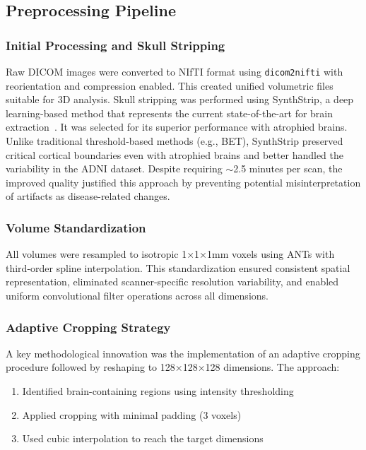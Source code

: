 \documentclass[11pt, a4paper]{article}
\begin{document}
\subsection{Preprocessing Pipeline}

\subsubsection{Initial Processing and Skull Stripping}

Raw DICOM images were converted to NIfTI format using \texttt{dicom2nifti} with reorientation and compression enabled. This created unified volumetric files suitable for 3D analysis. Skull stripping was performed using SynthStrip, a deep learning-based method that represents the current state-of-the-art for brain extraction~\cite{hoopes2022synthstrip}. It was selected for its superior performance with atrophied brains. Unlike traditional threshold-based methods (e.g., BET), SynthStrip preserved critical cortical boundaries even with atrophied brains and better handled the variability in the ADNI dataset. Despite requiring $\sim$2.5 minutes per scan, the improved quality justified this approach by preventing potential misinterpretation of artifacts as disease-related changes.

\subsubsection{Volume Standardization}

All volumes were resampled to isotropic 1×1×1mm voxels using ANTs with third-order spline interpolation. This standardization ensured consistent spatial representation, eliminated scanner-specific resolution variability, and enabled uniform convolutional filter operations across all dimensions.

\subsubsection{Adaptive Cropping Strategy}

A key methodological innovation was the implementation of an adaptive cropping procedure followed by reshaping to 128×128×128 dimensions. The approach:

\begin{enumerate}
    \item Identified brain-containing regions using intensity thresholding
    \item Applied cropping with minimal padding (3 voxels)
    \item Used cubic interpolation to reach the target dimensions
\end{enumerate}
\end{document}
